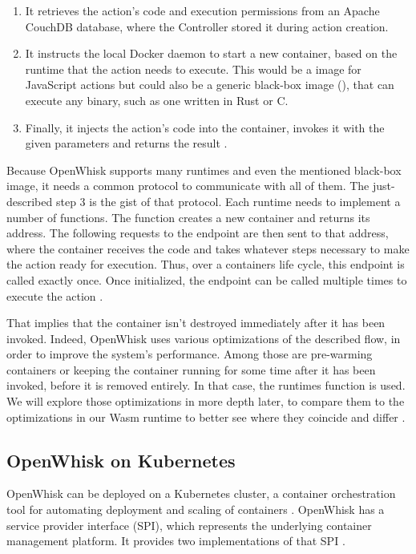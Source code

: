 \begin{enumerate}
    \item It retrieves the action's code and execution permissions from an Apache CouchDB database, where the Controller stored it during action creation. 
    \item It instructs the local Docker daemon to start a new container, based on the runtime that the action needs to execute. This would be a  image for JavaScript actions but could also be a generic black-box image (), that can execute any binary, such as one written in Rust or C.
    \item Finally, it injects the action's code into the container, invokes it with the given parameters and returns the result \cite{OpenWhiskSystemDesign}.
\end{enumerate}

Because OpenWhisk supports many runtimes and even the mentioned black-box image, it needs a common protocol to communicate with all of them. The just-described step 3 is the gist of that protocol. Each runtime needs to implement a number of functions. The  function creates a new container and returns its address. The following requests to the  endpoint are then sent to that address, where the container receives the code and takes whatever steps necessary to make the action ready for execution. Thus, over a containers life cycle, this endpoint is called exactly once. Once initialized, the  endpoint can be called multiple times to execute the action \cite{OpenWhiskSystemDesign}.

That implies that the container isn't destroyed immediately after it has been invoked. Indeed, OpenWhisk uses various optimizations of the described flow, in order to improve the system's performance. Among those are pre-warming containers or keeping the container running for some time after it has been invoked, before it is removed entirely. In that case, the runtimes  function is used.
We will explore those optimizations in more depth later, to compare them to the optimizations in our Wasm runtime to better see where they coincide and differ \cite{OpenWhiskSystemDesign}.

\subsection{OpenWhisk on Kubernetes}

OpenWhisk can be deployed on a Kubernetes cluster, a container orchestration tool for automating deployment and scaling of containers \cite{Kub2021}. OpenWhisk has a  service provider interface (SPI), which represents the underlying container management platform. It provides two implementations of that SPI \cite{OWKub2020}.

